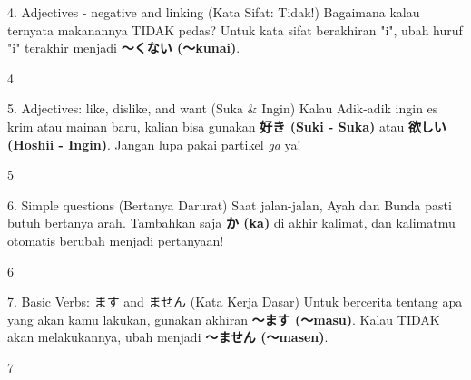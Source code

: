 \begin{lessonbox}{4. Adjectives - negative and linking (Kata Sifat: Tidak!)}
    Bagaimana kalau ternyata makanannya TIDAK pedas? Untuk kata sifat berakhiran "i", ubah huruf "i" terakhir menjadi \textbf{〜くない (〜kunai)}. 
\end{lessonbox}
\begin{convobox}{4}
    \noindent
       
     

    \vspace{1.5em}
\end{convobox}

\begin{lessonbox}{5. Adjectives: like, dislike, and want (Suka \& Ingin)}
    Kalau Adik-adik ingin es krim atau mainan baru, kalian bisa gunakan \textbf{好き (Suki - Suka)} atau \textbf{欲しい (Hoshii - Ingin)}. Jangan lupa pakai partikel \textit{ga} ya!
\end{lessonbox}
\begin{convobox}{5}
    \noindent
      
      
     

    \vspace{1.5em}
\end{convobox}

\begin{lessonbox}{6. Simple questions (Bertanya Darurat)}
    Saat jalan-jalan, Ayah dan Bunda pasti butuh bertanya arah. Tambahkan saja \textbf{か (ka)} di akhir kalimat, dan kalimatmu otomatis berubah menjadi pertanyaan!
\end{lessonbox}
\begin{convobox}{6}
    \noindent
      
     

    \vspace{1.5em}
\end{convobox}

\begin{lessonbox}{7. Basic Verbs: ます and ません (Kata Kerja Dasar)}
    Untuk bercerita tentang apa yang akan kamu lakukan, gunakan akhiran \textbf{〜ます (〜masu)}. Kalau TIDAK akan melakukannya, ubah menjadi \textbf{〜ません (〜masen)}.
\end{lessonbox}
\begin{convobox}{7}
    \noindent
      

    \vspace{1.5em}
\end{convobox}

